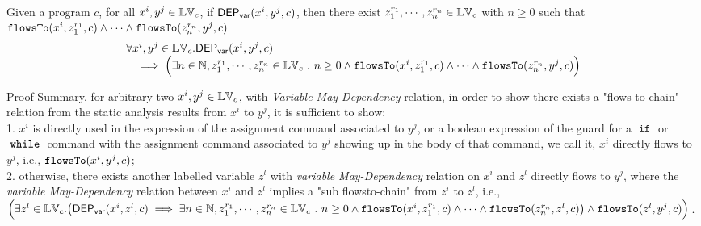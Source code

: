 \begin{thm}
\label{thm:flowsto_soundness}
Given a program ${c}$, for all  $ x^i, y^j \in \mathbb{LV}_{{c}}$, if $\mathsf{DEP_{var}}(x^i, y^j, {c})$,
then
there exist $z_1^{r_1}, \cdots, z_n^{r_n} \in \mathbb{LV}_{{c}}$ with $n \geq 0$ such that   
$\mathtt{flowsTo}(x^i,  z_1^{r_1}, c) 
\land \cdots \land \mathtt{flowsTo}(z_n^{r_n}, y^j, c)$
%
\[
\begin{array}{l}
  \forall x^i, y^j \in \mathbb{LV}_{{c}}.
  \mathsf{DEP_{var}}(x^i, y^j, {c})
  \\ \quad \implies
  \Big( \exists n \in \mathbb{N}, z_1^{r_1}, \cdots, z_n^{r_n} \in \mathbb{LV}_{{c}} ~.~ n \geq 0 \land
  \mathtt{flowsTo}(x^i,  z_1^{r_1}, c) 
  \land \cdots \land \mathtt{flowsTo}(z_n^{r_n}, y^j, c) \Big)
\end{array}
\]
\end{thm}
Proof Summary, for  arbitrary two $x^i, y^j \in \mathbb{LV}_c$, with \emph{Variable May-Dependency} relation, in order to show there exists a 
"flows-to chain" relation from the static analysis results from $x^i$ to $y^j$, it is sufficient to show:
  \\
  1. $x^i$ is directly used in the expression of the assignment command associated to $y^j$, or a boolean
  expression of the guard for a $\;\mathtt{if}\;$ or $\;\mathtt{while}\;$ command with the assignment command associated to $y^j$ showing up in the body of that command, 
  we call it, $x^i$ directly flows to $y^j$,
  i.e.,
  $ \mathtt{flowsTo}(x^i, y^j, {c})$;
  \\
  2. otherwise, there exists another labelled variable $z^l$ with \emph{variable May-Dependency} relation on $x^i$ and 
  $z^l$ directly flows to $y^j$, where the \emph{variable May-Dependency} relation between $x^i$ and $z^l$
   implies a "sub flowsto-chain" from $z^i$ to $z^l$, 
  i.e., 
  \\
  $\Big(
    \exists z^l \in \lvar_{{c}}.
  \left(\vardep(x^i, z^l, {c})   
  \implies
   \exists n \in \mathbb{N}, z_1^{r_1}, \cdots, z_n^{r_n} \in \lvar_{{c}} \st n \geq 0 \land
  \flowsto(x^i,  z_1^{r_1}, c) 
  \land \cdots \land \flowsto(z_n^{r_n}, z^l, c)
  \right)
  \land  \flowsto(z^l, y^j, {c})
  \Big)$.
%
